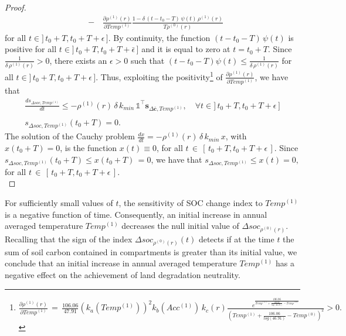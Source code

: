 \begin{proof}
$$\begin{array}{rcl}
&-&\,
 \displaystyle \frac{\partial\rho^{(1)}(r)}{\partial Temp^{(1)}} \displaystyle \frac{1- \delta\, (t-t_0-T) \, \psi(t)\, \rho^{(1)}(r) }{T\rho^{(0)}(r)}
\end{array}
$$
for all $t\in]\,t_0+T,t_0+T+\epsilon\,]$.
\noindent By continuity,  the function $(t-t_0-T) \, \psi(t) $ is positive for all $t\in]\,t_0+T,t_0+T+ \bar \epsilon\,]$ and it is equal to zero at $t=t_0+T$. Since $\displaystyle \frac{1}{\delta \, \rho^{(1)}(r)}>0$, there exists an $\epsilon>0$ such that
$(t-t_0-T) \psi(t) \leq \displaystyle \frac{1}{\delta \, \rho^{(1)}(r)}$ for all $t\in]\,t_0+T,t_0+T+ \epsilon\,]$. Thus, exploiting the positivity\footnote{  $\frac{\partial\rho^{(1)}(r)} {\partial Temp^{(1)}} \,=\,\frac{106.06}{47.91} (k_a(Temp^{(1)}))^2 k_b(Acc^{(1)})\,k_c(r) \frac{e^{\frac{106.06}{Temp^{(1)}+\frac{106.06}{log(46.91)} -Temp^{(0)} } }}{(Temp^{(1)}+\frac{106.06}{log(46.91)} -Temp^{(0)})^2}>0.$} of $\displaystyle \frac{\partial\rho^{(1)}(r)}{\partial Temp^{(1)}}$, we have that 
$$\begin{array}{l}
\displaystyle \frac{d s_{\Delta soc,Temp^{(1)}}}{dt} \leq -\rho^{(1)}(r)\, \delta \,k_{min}\,\mathds{1}^\intercal \mathbf{s}_{\Delta \mathbf{\overline c},Temp^{(1)}},\quad \forall t\in]\,t_0+T,t_0+T+ \epsilon\,]\\\\
s_{\Delta soc,Temp^{(1)}}(t_0+T)=0.
\end{array}
$$
\noindent The solution of the Cauchy problem
$\displaystyle \frac{dx}{dt}=-\rho^{(1)}(r)\,\delta\,k_{min}\, x$, with $ x(t_0+T)=0$, is the function $x(t)\equiv 0$, for all $t\,\in \,[\,t_0+T,t_0+T+\epsilon\,]$.
Since $s_{\Delta soc,Temp^{(1)}}(t_0+T)\leq x(t_0+T)\, =0 $, we have that $s_{\Delta soc,Temp^{(1)}}\leq x(t)=0,$ for all $t\,\in \,[\,t_0+T,t_0+T+\epsilon\,]$.\\
 \end{proof}

\begin{remark}\label{remark: temp1}
For sufficiently small values of $t$, the sensitivity  of SOC change index to $Temp^{(1)}$ is a negative function of time. Consequently, an initial increase in annual averaged temperature  $Temp^{(1)}$ decreases the null initial  value of $\Delta soc_{\rho^{(0)}(r)}$. Recalling that the sign of the index $\Delta soc_{\rho^{(0)}(r)}(t)$ detects if at the time $t$ the sum of  soil carbon contained in  compartments is greater than its initial value, we conclude that an initial increase in annual averaged temperature  $Temp^{(1)}$
has a negative effect on the achievement of land degradation neutrality. 
\end{remark}
